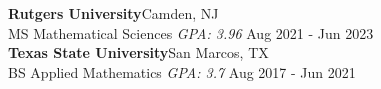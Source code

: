 \textbf{Rutgers University}\hfill Camden, NJ\\
MS Mathematical Sciences \textit{GPA: 3.96} \hfill Aug 2021 - Jun 2023\\
\vspace{2mm}
\textbf{Texas State University}\hfill San Marcos, TX\\
BS Applied Mathematics \textit{GPA: 3.7} \hfill Aug 2017 - Jun 2021\\
\vspace{2mm}


